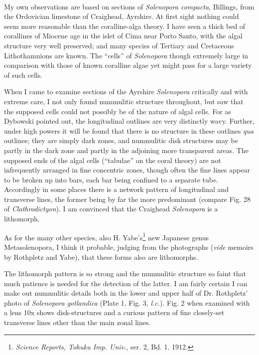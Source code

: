 \documentclass[a4paper, 12pt, oneside]{article}
\begin{document}
\paragraph{}
My own observations are based on sections of \emph{Solenopora compacta}, Billings, from the Ordovician limestone of Craighead, Ayrshire. At first sight nothing could seem more reasonable than the coralline-alga theory. I have seen a thick bed of corallines of Miocene age in the islet of Cima near Porto Santo, with the algal structure very well preserved; and many species of Tertiary and Cretaceous Lithothamnions are known. The ``cells'' of \emph{Solenopora} though extremely large in comparison with those of known coralline algae yet might pass for a large variety of such cells.

When I came to examine sections of the Ayrshire \emph{Solenopora} critically and with extreme care, I not only found nummulitic structure throughout, but saw that the supposed cells could not possibly be of the nature of algal cells. For as Dybowski pointed out, the longitudinal outlines are very distinctly wavy. Further, under high powers it will be found that there is no structure in these outlines \emph{qua} outlines; they are simply dark zones, and nummulitic disk structures may be partly in the dark zone and partly in the adjoining more transparent areas. The supposed ends of the algal cells (``tabulae'' on the coral theory) are not infrequently arranged in fine concentric zones, though often the fine lines appear to be broken up into bars, each bar being confined to a separate tube. Accordingly in some places there is a network pattern of longitudinal and transverse lines, the former being by far the more predominant (compare Fig. 28 of \emph{Clathrodictyon}). I am convinced that the Craighead \emph{Solenopora} is a lithomorph.

As for the many other species, also H. Yabe's\footnote{\emph{Science Reports, Tohuku Imp. Univ.}, ser. 2, Bd. 1. 1912.} new Japanese genus Metasolenopora, I think it probable, judging from the photographs (\emph{vide} memoirs by Rothpletz and Yabe), that these forms also are lithomorphs.

The lithomorph pattern is so strong and the nummulitic structure so faint that much patience is needed for the detection of the latter. I am fairly certain I can make out nummulitic details both in the lower and upper half of Dr. Rothpletz' photo of \emph{Solenopora gotlandica} (Plate 1, Fig. 3, \emph{l.c.}). Fig. 2 when examined with a lens 10x shows disk-structures and a curious pattern of fine closely-set transverse lines other than the main zonal lines.
\end{document}
